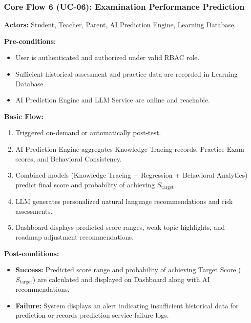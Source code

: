 \documentclass[12pt,a4paper]{article}
\begin{document}
\subsubsection{Core Flow 6 (UC-06): Examination Performance Prediction}

\noindent\textbf{Actors:} Student, Teacher, Parent, AI Prediction Engine, Learning Database.

\vspace{0.2cm}
\noindent\textbf{Pre-conditions:}
\begin{itemize}[leftmargin=1.5em, itemsep=0.1em]
    \item User is authenticated and authorized under valid RBAC role.
    \item Sufficient historical assessment and practice data are recorded in Learning Database.
    \item AI Prediction Engine and LLM Service are online and reachable.
\end{itemize}

\noindent\textbf{Basic Flow:}
\begin{enumerate}[leftmargin=1.5em, itemsep=0.2em]
    \item Triggered on-demand or automatically post-test.
    \item AI Prediction Engine aggregates Knowledge Tracing records, Practice Exam scores, and Behavioral Consistency.
    \item Combined models (Knowledge Tracing + Regression + Behavioral Analytics) predict final score and probability of achieving $S_{\text{target}}$.
    \item LLM generates personalized natural language recommendations and risk assessments.
    \item Dashboard displays predicted score ranges, weak topic highlights, and roadmap adjustment recommendations.
\end{enumerate}

\noindent\textbf{Post-conditions:}
\begin{itemize}[leftmargin=1.5em, itemsep=0.2em]
    \item \textbf{Success:} Predicted score range and probability of achieving Target Score ($S_{\text{target}}$) are calculated and displayed on Dashboard along with AI recommendations.
    \item \textbf{Failure:} System displays an alert indicating insufficient historical data for prediction or records prediction service failure logs.
\end{itemize}
\end{document}
